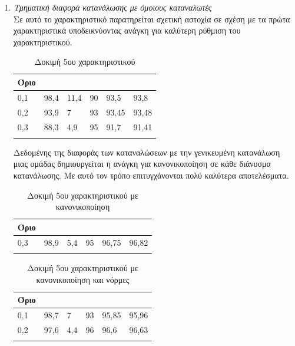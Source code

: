 \begin{enumerate}
\item{\textit{Τμηματική διαφορά κατανάλωσης με όμοιους καταναλωτές}} \\
Σε αυτό το χαρακτηριστικό παρατηρείται σχετική αστοχία σε σχέση με τα πρώτα χαρακτηριστικά υποδεικνύοντας ανάγκη για καλύτερη ρύθμιση του χαρακτηριστικού. 
\begin{center}
\begin{longtabu} to 0.8\textwidth { | X[c] || X[c] | X[c] | X[c] | X[c] | X[c] |  }
 \hline
  Όριο &   &  &  &  & \\
 ,1&	98,4&	11,4&	90&	93,5&	93,8\\
0,2&	93,9&	7&	93&	93,45	&93,48\\
0,3&	88,3&	4,9&	95&	91,7	&91,41\\
\hline
\caption{Δοκιμή 5ου χαρακτηριστικού}
\label{testfeat5}
\end{longtabu}
\end{center}
Δεδομένης της διαφοράς των καταναλώσεων με την γενικευμένη κατανάλωση μιας ομάδας δημιουργείται η ανάγκη για κανονικοποίηση σε κάθε διάνυσμα κατανάλωσης. Με αυτό τον τρόπο επιτυγχάνονται πολύ καλύτερα αποτελέσματα.
\begin{center}
\begin{longtabu} to 0.8\textwidth { | X[c] || X[c] | X[c] | X[c] | X[c] | X[c] |  }
 \hline
  Όριο &   &  &  &  & \\
 ,3&	98,9&	5,4&	95&	96,75&	96,82\\
\hline
\caption{Δοκιμή 5ου χαρακτηριστικού με κανονικοποίηση}
\label{testfeat5normalized}
\end{longtabu}
\end{center}

\begin{center}
\begin{longtabu} to 0.8\textwidth { | X[c] || X[c] | X[c] | X[c] | X[c] | X[c] |  }
 \hline
  Όριο &   &  &  &  & \\
 ,1&	98,7&	7&	93&	95,85&	95,96\\
0,2&	97,6&	4,4&96&	96,6&	96,63\\
\hline
\caption{Δοκιμή 5ου χαρακτηριστικού με κανονικοποίηση και νόρμες}
\label{testfeat5normalizednorms}
\end{longtabu}
\end{center}


\end{enumerate}
